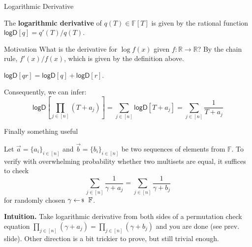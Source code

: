 \documentclass{zkdl-presentation-template}
\begin{document}
    \begin{frame}{Logarithmic Derivative}
        \begin{definition}
            The \textbf{logarithmic derivative} of $q(T) \in \mathbb{F}[T]$ is given by the 
            rational function $\mathsf{logD}[q] = q'(T)/q(T)$.\pause
        \end{definition}
        \begin{remarkblock}{Motivation}
            What is the derivative for $\log f(x)$ given $f: \mathbb{R} \to
            \mathbb{R}$?\pause \hspace{1px} By the chain rule, $f'(x)/f(x)$, which is given by
            the definition above.\pause
        \end{remarkblock}

        \begin{lemma}
            $\mathsf{logD}[qr]=\mathsf{logD}[q] + \mathsf{logD}[r]$.\pause
        \end{lemma}

        Consequently, we can infer:
        \begin{equation*}
            \mathsf{logD}\left[\prod_{j \in [n]} (T+a_j)\right] = \sum_{j \in [n]} \mathsf{logD}\left[T+a_j\right] = \sum_{j \in [n]} \frac{1}{T+a_j}
        \end{equation*}
    \end{frame}

    \begin{frame}{Finally something useful}
        \begin{lemma}
            Let $\vec{a} = \{a_i\}_{i \in [n]}$ and $\vec{b} = \{b_i\}_{i \in [n]}$ be
            two sequences of elements from $\mathbb{F}$. To verify with overwhelming
            probability whether two multisets are equal, it suffices to check
            \begin{equation*}
                \sum_{j \in [n]} \frac{1}{\gamma + a_j} = \sum_{j \in [n]} \frac{1}{\gamma+b_j}
            \end{equation*}
            for randomly chosen $\gamma \leftarrowS \mathbb{F}$.\pause
        \end{lemma}

        \textbf{Intuition.} Take logarithmic derivative from both sides of a
        permutation check equation $\prod_{j \in [n]} (\gamma+a_j) = \prod_{j \in [n]}
        (\gamma+b_j)$ and you are done (see prev. slide). Other direction is a
        bit trickier to prove, but still trivial enough.
    \end{frame}
\end{document}
